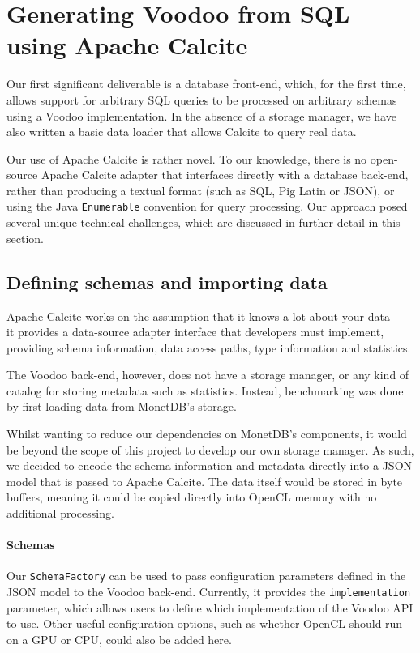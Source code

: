 \section{Generating Voodoo from SQL using Apache Calcite}
\label{section:sql-to-voodoo}

Our first significant deliverable is a database front-end, which, for the first time, allows support for arbitrary SQL queries to be processed on arbitrary schemas using a Voodoo implementation. In the absence of a storage manager, we have also written a basic data loader that allows Calcite to query real data.

Our use of Apache Calcite is rather novel. To our knowledge, there is no open-source Apache Calcite adapter that interfaces directly with a database back-end, rather than producing a textual format (such as SQL, Pig Latin or JSON), or using the Java \texttt{Enumerable} convention for query processing. Our approach posed several unique technical challenges, which are discussed in further detail in this section.

\subsection{Defining schemas and importing data}

Apache Calcite works on the assumption that it knows a lot about your data — it provides a data-source adapter interface that developers must implement, providing schema information, data access paths, type information and statistics.

The Voodoo back-end, however, does not have a storage manager, or any kind of catalog for storing metadata such as statistics. Instead, benchmarking was done by first loading data from MonetDB's storage.

Whilst wanting to reduce our dependencies on MonetDB's components, it would be beyond the scope of this project to develop our own storage manager. As such, we decided to encode the schema information and metadata directly into a JSON model that is passed to Apache Calcite. The data itself would be stored in byte buffers, meaning it could be copied directly into OpenCL memory with no additional processing.

\paragraph{Schemas}

Our \texttt{SchemaFactory} can be used to pass configuration parameters defined in the JSON model to the Voodoo back-end. Currently, it provides the \texttt{implementation} parameter, which allows users to define which implementation of the Voodoo API to use. Other useful configuration options, such as whether OpenCL should run on a GPU or CPU, could also be added here.

